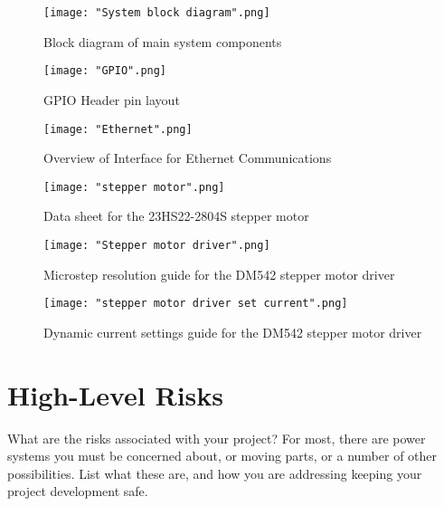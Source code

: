 \pagebreak[4]

\begin{figure}[h!]
	\centering
	{\texttt{[image: "System block diagram".png]}}
	\caption{Block diagram of main system components}
	\label{fig:BD1}
\end{figure}

\pagebreak[4]

\begin{figure}[h!]
	\centering
	{\texttt{[image: "GPIO".png]}}
	\caption{GPIO Header pin layout}
	\label{fig:GPIO}
\end{figure}


\pagebreak[4]

\begin{figure}[h!]
	\centering
	{\texttt{[image: "Ethernet".png]}}
	\caption{Overview of Interface for Ethernet Communications}
	\label{fig:Ether}
\end{figure}

\pagebreak[4]


\begin{figure}[h!]
	\centering
	{\texttt{[image: "stepper motor".png]}}
	\caption{Data sheet for the 23HS22-2804S stepper motor}
	\label{fig:SM}
\end{figure}

\pagebreak[4]

\begin{figure}[h!]
	\centering
	{\texttt{[image: "Stepper motor driver".png]}}
	\caption{Microstep resolution guide for the DM542 stepper motor driver}
	\label{fig:SMD1}
\end{figure}

\pagebreak[4]

\begin{figure}[h!]
	\centering
	{\texttt{[image: "stepper motor driver set current".png]}}
	\caption{Dynamic current settings guide for the DM542 stepper motor driver}
	\label{fig:SMD2}
\end{figure}

\pagebreak[4]

\section{High-Level Risks}
What are the risks associated with your project?  For most, there are power systems you must be concerned about,
or moving parts, or a number of other possibilities.  List what these are, and how you are addressing keeping
your project development safe.

